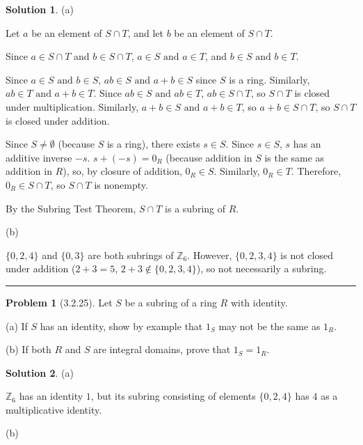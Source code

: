 \documentclass[12pt]{article}
\theoremstyle{definition}
\newtheorem*{prob}{Problem}
\newtheorem*{soln}{Solution}
\newcommand{\hr}{\vspace*{\parskip}\hrule}
\newcommand{\ZZ}{{\mathbb{Z}}}
\begin{document}
\begin{soln}

(a)

Let $a$ be an element of $S\cap T$, and let $b$ be an element of $S\cap T$.

\renewcommand\land{\text{ and }}
Since $a\in S\cap T$ and $b\in S\cap T$, $a\in S\land a\in T$, and $b\in S\land b\in T$.

Since $a\in S\land b\in S$, $ab\in S\land a+b\in S$ since $S$ is a ring.
Similarly, $ab\in T\land a+b\in T$.
Since $ab\in S\land ab\in T$, $ab\in S\cap T$, so $S\cap T$ is closed under multiplication.
Similarly, $a+b\in S\land a+b\in T$, so $a+b\in S\cap T$, so $S\cap T$ is closed under addition.

Since $S\neq\emptyset$ (because $S$ is a ring), there exists $s\in S$.
Since $s\in S$, $s$ has an additive inverse $-s$.
$s+(-s)=0_R$ (because addition in $S$ is the same as addition in $R$),
so, by closure of addition, $0_R\in S$.
Similarly, $0_R\in T$.
Therefore, $0_R\in S\cap T$, so $S\cap T$ is nonempty.

By the Subring Test Theorem, $S\cap T$ is a subring of $R$.

(b)

$\{0, 2, 4\}$ and $\{0, 3\}$ are both subrings of $\ZZ_6$.
However, $\{0, 2, 3, 4\}$ is not closed under addition
($2+3=5$, $2+3\not\in\{0,2,3,4\}$),
so not necessarily a subring.

\end{soln}

\hr


%
%
%
%


\begin{prob}[3.2.25] Let $S$ be a subring of a ring $R$ with identity.

(a) If $S$ has an identity, show by example that $1_S$ may not be the same as $1_R$.

(b) If both $R$ and $S$ are integral domains, prove that $1_S=1_R$.
\end{prob}

\begin{soln} (a)

$\ZZ_6$ has an identity $1$, but its subring consisting of elements
$\{0, 2, 4\}$ has $4$ as a multiplicative identity.

(b)


\end{soln}
\end{document}
